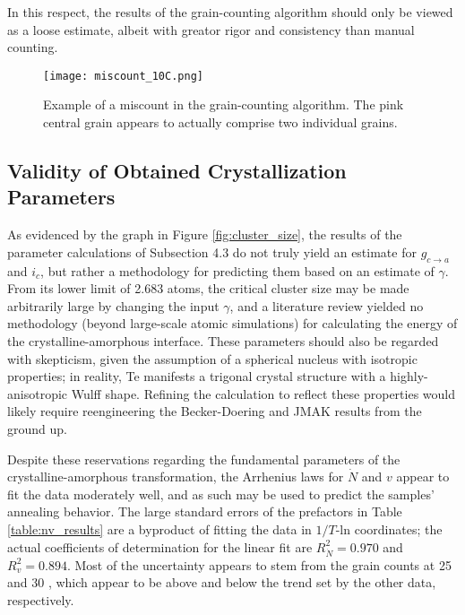 In this respect, the results of the grain-counting algorithm should only be viewed as a loose estimate, albeit with greator rigor and consistency than manual counting.

	\begin{figure}[h]
		\centering
		\texttt{[image: miscount\_10C.png]}
		\caption{Example of a miscount in the grain-counting algorithm.  The pink central grain appears to actually comprise two individual grains.}
		\label{fig:miscount}
	\end{figure}

\subsection{Validity of Obtained Crystallization Parameters}

As evidenced by the graph in Figure \ref{fig:cluster_size}, the results of the parameter calculations of Subsection 4.3 do not truly yield an estimate for $g_{c \rightarrow a}$ and $i_c$, but rather a methodology for predicting them based on an estimate of $\gamma$.  From its lower limit of 2.683 atoms, the critical cluster size may be made arbitrarily large by changing the input $\gamma$, and a literature review yielded no methodology (beyond large-scale atomic simulations) for calculating the energy of the crystalline-amorphous interface.  These parameters should also be regarded with skepticism, given the assumption of a spherical nucleus with isotropic properties; in reality, Te manifests a trigonal crystal structure with a highly-anisotropic Wulff shape.\cite{jain:2018}  Refining the calculation to reflect these properties would likely require reengineering the Becker-Doering and JMAK results from the ground up.

Despite these reservations regarding the fundamental parameters of the crystalline-amorphous transformation, the Arrhenius laws for $\dot{N}$ and $v$ appear to fit the data moderately well, and as such may be used to predict the samples' annealing behavior.  The large standard errors of the prefactors in Table \ref{table:nv_results} are a byproduct of fitting the data in $1/T$-ln coordinates; the actual coefficients of determination for the linear fit are $R^2_{\dot{N}} = 0.970$ and $R^2_v = 0.894$.  Most of the uncertainty appears to stem from the grain counts at 25  and 30 , which appear to be above and below the trend set by the other data, respectively.

